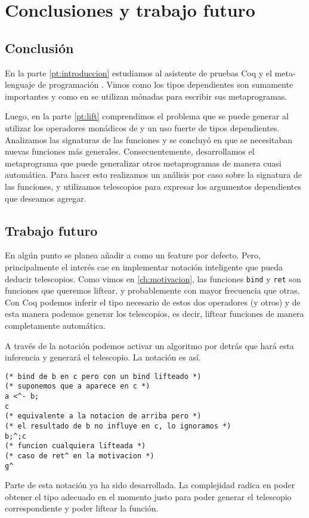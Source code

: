 \chapter{Conclusiones y trabajo futuro}\label{ch:conclusion}

\section{Conclusión}\label{sc:conclusion}

En la parte \ref{pt:introduccion} estudiamos al asistente de pruebas Coq y el meta-lenguaje de programación \mtac. Vimos como los tipos dependientes son sumamente importantes y como en \mtac se utilizan mónadas para escribir sus metaprogramas.

Luego, en la parte \ref{pt:lift} comprendimos el problema que se puede generar al utilizar los operadores monádicos de \mtac y un uso fuerte de tipos dependientes. Analizamos las signaturas de las funciones y se concluyó en que se necesitaban nuevas funciones más generales.
Consecuentemente, desarrollamos el metaprograma \lift que puede generalizar otros metaprogramas de manera cuasi automática. Para hacer esto realizamos un análisis por caso sobre la signatura de las funciones, y utilizamos telescopios para expresar los argumentos dependientes que deseamos agregar.

\section{Trabajo futuro}\label{sc:futuro}

En algún punto se planea añadir \lift a \mtac como un feature por defecto.
Pero, principalmente el interés cae en implementar notación inteligente que pueda deducir telescopios.
Como vimos en \ref{ch:motivacion}, las funciones \lstinline{bind} y \lstinline{ret} son funciones que queremos liftear, y probablemente con mayor frecuencia que otras.
Con Coq podemos inferir el tipo necesario de estos dos operadores (y otros) y de esta manera podemos generar los telescopios, es decir, liftear funciones de manera completamente automática.

A través de la notación podemos activar un algoritmo por detrás que hará esta inferencia y generará el telescopio.
La notación es así.

\begin{lstlisting}
(* bind de b en c pero con un bind lifteado *)
(* suponemos que a aparece en c *)
a <^- b;
c 
(* equivalente a la notacion de arriba pero *)
(* el resultado de b no influye en c, lo ignoramos *)
b;^;c
(* funcion cualquiera lifteada *)
(* caso de ret^ en la motivacion *)
g^ 
\end{lstlisting}

Parte de esta notación ya ha sido desarrollada. La complejidad radica en poder obtener el tipo adecuado en el momento justo para poder generar el telescopio correspondiente y poder liftear la función.
